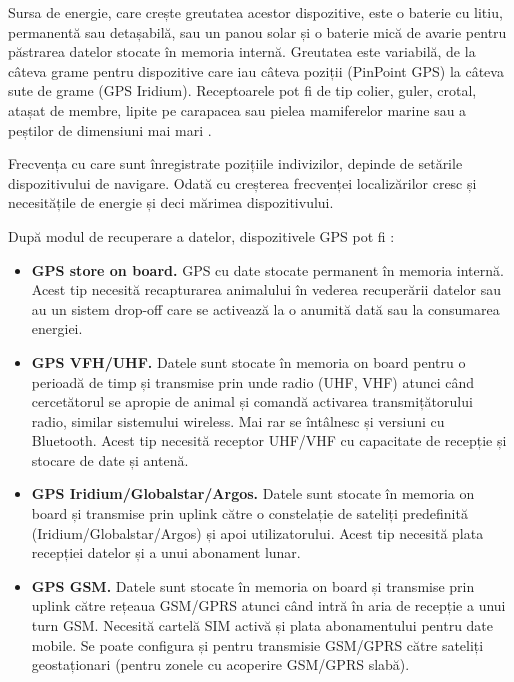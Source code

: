 \documentclass[11pt,onehalfspacing]{elife}
\begin{document}
Sursa de energie, care crește greutatea acestor dispozitive, este o baterie cu litiu, permanentă sau detașabilă, sau un panou solar și o baterie mică de avarie pentru păstrarea datelor stocate în memoria internă. Greutatea este variabilă, de la câteva grame pentru dispozitive care iau câteva poziții (PinPoint GPS) la câteva sute de grame (GPS Iridium). Receptoarele pot fi de tip colier, guler, crotal, atașat de membre, lipite pe carapacea sau pielea mamiferelor marine sau a peștilor de dimensiuni mai mari \citep{Thomas2012}.

Frecvența cu care sunt înregistrate pozițiile indivizilor, depinde de setările dispozitivului de navigare. Odată cu creșterea frecvenței localizărilor cresc și necesitățile de energie și deci mărimea dispozitivului. 

După modul de recuperare a datelor, dispozitivele GPS pot fi \citep{Thomas2012}:

\begin{itemize}
  \item \textbf{GPS store on board.} GPS cu date stocate permanent în memoria internă. Acest tip necesită recapturarea animalului în vederea recuperării datelor sau au un sistem drop-off care se activează la o anumită dată sau la consumarea energiei.\\
  \item \textbf{GPS VFH/UHF.} Datele sunt stocate în memoria on board pentru o perioadă de timp și transmise prin unde radio (UHF, VHF) atunci când cercetătorul se apropie de animal și comandă activarea transmițătorului radio, similar sistemului wireless. Mai rar se întâlnesc și versiuni cu Bluetooth. Acest tip necesită receptor UHF/VHF cu capacitate de recepție și stocare de date și antenă.\\
  \item \textbf{GPS Iridium/Globalstar/Argos.} Datele sunt stocate în memoria on board și transmise prin uplink către o constelație de sateliți predefinită (Iridium/Globalstar/Argos) și apoi utilizatorului. Acest tip necesită plata recepției datelor și a unui abonament lunar.\\
  \item \textbf{GPS GSM.} Datele sunt stocate în memoria on board și transmise prin uplink către rețeaua GSM/GPRS atunci când intră în aria de recepție a unui turn GSM. Necesită cartelă SIM activă și plata abonamentului pentru date mobile. Se poate configura și pentru transmisie GSM/GPRS către sateliți geostaționari (pentru zonele cu acoperire GSM/GPRS slabă).
\end{itemize}
\end{document}
